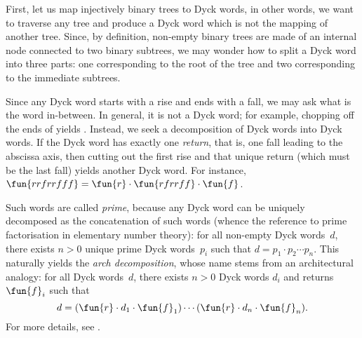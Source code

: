 First, let us map injectively binary trees to Dyck words, in other
words, we want to traverse any tree and produce a Dyck word which is
not the mapping of another tree. Since, by definition, non\hyp{}empty
binary trees are made of an internal node connected to two binary
subtrees, we may wonder how to split a Dyck word into three parts: one
corresponding to the root of the tree and two corresponding to the
immediate subtrees.

Since any Dyck word starts with a rise and ends with a fall, we may
ask what is the word in\hyp{}between. In general, it is not a Dyck
word; for example, chopping off the ends of  yields
. Instead, we seek a decomposition of Dyck words into Dyck
words. If the Dyck word has exactly one \emph{return}, that is, one
fall leading to the abscissa axis, then cutting out the first rise and
that unique return (which must be the last fall) yields another Dyck
word. For instance, \(\fun{rrfrrfff} = \fun{r} \cdot \fun{rfrrff}
\cdot \fun{f}\).

Such words are called \emph{prime}, because any Dyck word can be
uniquely decomposed as the concatenation of such words (whence the
reference to prime factorisation in elementary number theory): for all
non\hyp{}empty Dyck words~\(d\), there exists \({n > 0}\) unique prime
Dyck words~\(p_i\) such that \(d = p_1 \cdot p_2 \cdots p_n\). This
naturally yields the \emph{arch decomposition}, whose name stems from an
architectural analogy: for all Dyck words~\(d\), there exists \({n >
  0}\) Dyck words \(d_i\) and returns~\(\fun{f}_i\) such that
\begin{equation*}
d = (\fun{r} \cdot d_1 \cdot \fun{f}_1) \cdots (\fun{r} \cdot d_n
\cdot \fun{f}_n).
\end{equation*}
For more details, see \cite{PanayotopoulosSapounakis_1995,
  Lothaire_2005, FlajoletSedgewick_2009}.

